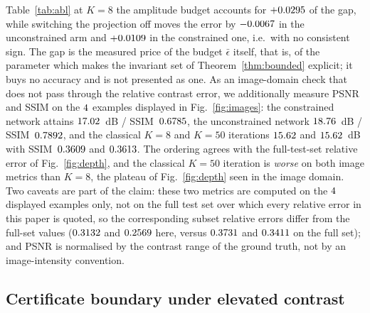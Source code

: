 \documentclass[journal,cmes,article,submit,moreauthors,pdftex]{Definitions/tsp}
\newcommand{\numv}[1]{#1}
\begin{document}
Table~\ref{tab:abl} at $K=8$ the amplitude budget accounts for $+\numv{\NumPriceBudget}$ of the
gap, while switching the projection off moves the error by $-\numv{\NumPriceProjUnc}$ in the
unconstrained arm and $+\numv{\NumPriceProjCons}$ in the constrained one, i.e.\ with no
consistent sign. The gap is the measured price of the budget $\bar\epsilon$ itself, that is, of
the parameter which makes the invariant set of Theorem~\ref{thm:bounded} explicit; it buys no
accuracy and is not presented as one.
As an image-domain check that does not
pass through the relative contrast error, we additionally measure PSNR and SSIM on the
$\numv{\NumNImg}$ examples displayed in Fig.~\ref{fig:images}: the constrained network attains
$\numv{\NumPsnrCons}$~dB / SSIM~$\numv{\NumSsimCons}$, the unconstrained network
$\numv{\NumPsnrUnc}$~dB / SSIM~$\numv{\NumSsimUnc}$, and the classical $K=8$ and $K=50$ iterations
$\numv{\NumPsnrClsEight}$ and $\numv{\NumPsnrClsFiveZero}$~dB with SSIM~$\numv{\NumSsimClsEight}$ and
$\numv{\NumSsimClsFiveZero}$. The ordering agrees with the full-test-set relative error of
Fig.~\ref{fig:depth}, and the classical $K=50$ iteration is \emph{worse} on both image metrics than
$K=8$, the plateau of Fig.~\ref{fig:depth} seen in the image domain. Two caveats are part of the
claim: these two metrics are computed on the $\numv{\NumNImg}$ displayed examples only, not on the
full test set over which every relative error in this paper is quoted, so the corresponding
subset relative errors differ from the full-set values ($\numv{\NumRreImgCons}$ and
$\numv{\NumRreImgUnc}$ here, versus $\numv{\NumConsEight}$ and $\numv{\NumUncEight}$ on the full
set); and PSNR is normalised by the contrast range of the ground truth, not by an image-intensity
convention.

\subsection{Certificate boundary under elevated contrast}
\label{sec:contrast}
\end{document}
